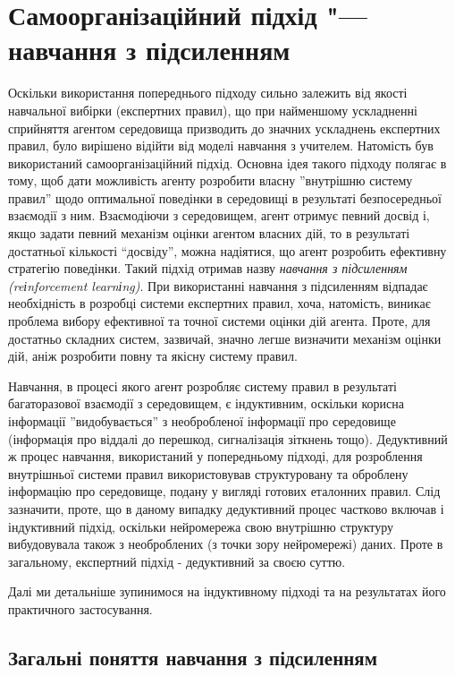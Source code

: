 \documentclass[a4paper,10pt,fleqn]{article}
\begin{document}
\section{Самоорганізаційний підхід "--- навчання з підсиленням}

Оскільки використання попереднього підходу сильно залежить від якості навчальної вибірки (експертних правил), що при найменшому ускладненні сприйняття агентом середовища призводить до значних ускладнень експертних правил, було вирішено відійти від моделі навчання з учителем. Натомість був використаний самоорганізаційний підхід. Основна ідея такого підходу полягає в тому, щоб дати можливість агенту розробити власну ''внутрішню систему правил'' щодо оптимальної поведінки в середовищі в результаті безпосередньої взаємодії з ним. Взаємодіючи з середовищем, агент отримує певний досвід і, якщо задати певний механізм оцінки агентом власних дій, то в результаті достатньої кількості ``досвіду'', можна надіятися, що агент розробить ефективну стратегію поведінки. Такий підхід отримав назву \emph{навчання з підсиленням (reіnforcement learnіng)}. При використанні навчання з підсиленням відпадає необхідність в розробці системи експертних правил, хоча, натомість, виникає проблема вибору ефективної та точної системи оцінки дій агента. Проте, для достатньо складних систем, зазвичай, значно легше визначити механізм оцінки дій, аніж розробити повну та якісну систему правил.

Навчання, в процесі якого агент розробляє систему правил в результаті багаторазової взаємодії з середовищем, є індуктивним, оскільки корисна інформації ''видобувається'' з необробленої інформації про середовище (інформація про віддалі до перешкод, сигналізація зіткнень тощо). Дедуктивний ж процес навчання, використаний у попередньому підході, для розроблення внутрішньої системи правил використовував структуровану та оброблену інформацію про середовище, подану у вигляді готових еталонних правил. Слід зазначити, проте, що в даному випадку дедуктивний процес частково включав і індуктивний підхід, оскільки нейромережа свою внутрішню структуру вибудовувала також з необроблених (з точки зору нейромережі) даних. Проте в загальному, експертний підхід - дедуктивний за своєю суттю. 

Далі ми детальніше зупинимося на індуктивному підході та на результатах його практичного застосування.

\subsection{Загальні поняття навчання з підсиленням}
\end{document}
